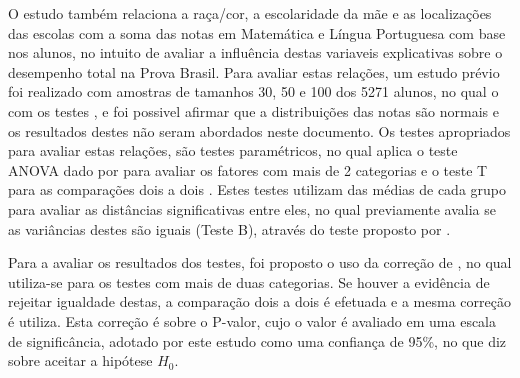 O estudo também relaciona a raça/cor, a escolaridade da mãe e as localizações das escolas com a soma das notas em Matemática 
e Língua Portuguesa com base nos alunos, no intuito de avaliar a influência destas variaveis explicativas sobre o desempenho
total na Prova Brasil. Para avaliar estas relações, um estudo prévio foi realizado com amostras de tamanhos 30, 50 e 100 dos 5271
alunos, no qual o com os testes ,  e 
foi possivel afirmar que a distribuições das notas são normais e os resultados destes não seram abordados neste documento. Os testes 
apropriados para avaliar estas relações, são testes paramétricos, no qual aplica o teste ANOVA dado por  para 
avaliar os fatores com mais de 2 categorias e o teste T para as comparações dois a dois \cite{o1908student}.
Estes testes utilizam das médias de cada grupo para avaliar as distâncias significativas entre eles, no qual previamente avalia se as
variâncias destes são iguais (Teste B), através do teste proposto por .

Para a avaliar os resultados dos testes, foi proposto o uso da correção de , no qual utiliza-se para os 
testes com mais de duas categorias. Se houver a evidência de rejeitar igualdade destas, a comparação dois a dois é efetuada e a mesma correção
é utiliza. Esta correção é sobre o P-valor, cujo o valor é avaliado em uma escala de significância, adotado por este estudo
como uma confiança de 95\%, no que diz sobre aceitar a hipótese $H_0$.
